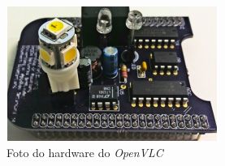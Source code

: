 \begin{figure}[!htbp]
    \caption{Foto do hardware do \textit{OpenVLC}} \label{fig_minipage_imagem1}
    \includegraphics[scale=0.9]{images/Cape.png}
\end{figure}

